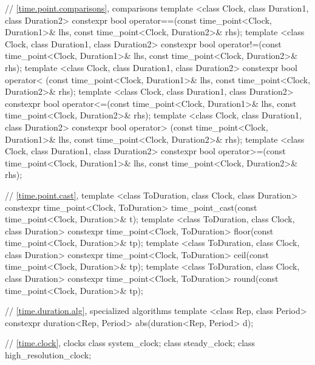 \begin{codeblock}
{{    // \ref{time.point.comparisons},  comparisons
    template <class Clock, class Duration1, class Duration2>
       constexpr bool operator==(const time_point<Clock, Duration1>& lhs,
                                 const time_point<Clock, Duration2>& rhs);
    template <class Clock, class Duration1, class Duration2>
       constexpr bool operator!=(const time_point<Clock, Duration1>& lhs,
                                 const time_point<Clock, Duration2>& rhs);
    template <class Clock, class Duration1, class Duration2>
       constexpr bool operator< (const time_point<Clock, Duration1>& lhs,
                                 const time_point<Clock, Duration2>& rhs);
    template <class Clock, class Duration1, class Duration2>
       constexpr bool operator<=(const time_point<Clock, Duration1>& lhs,
                                 const time_point<Clock, Duration2>& rhs);
    template <class Clock, class Duration1, class Duration2>
       constexpr bool operator> (const time_point<Clock, Duration1>& lhs,
                                 const time_point<Clock, Duration2>& rhs);
    template <class Clock, class Duration1, class Duration2>
       constexpr bool operator>=(const time_point<Clock, Duration1>& lhs,
                                 const time_point<Clock, Duration2>& rhs);

    // \ref{time.point.cast}, 
    template <class ToDuration, class Clock, class Duration>
      constexpr time_point<Clock, ToDuration>
      time_point_cast(const time_point<Clock, Duration>& t);
    template <class ToDuration, class Clock, class Duration>
      constexpr time_point<Clock, ToDuration>
      floor(const time_point<Clock, Duration>& tp);
    template <class ToDuration, class Clock, class Duration>
      constexpr time_point<Clock, ToDuration>
      ceil(const time_point<Clock, Duration>& tp);
    template <class ToDuration, class Clock, class Duration>
      constexpr time_point<Clock, ToDuration>
      round(const time_point<Clock, Duration>& tp);

    // \ref{time.duration.alg}, specialized algorithms
    template <class Rep, class Period>
      constexpr duration<Rep, Period> abs(duration<Rep, Period> d);

    // \ref{time.clock}, clocks
    class system_clock;
    class steady_clock;
    class high_resolution_clock;
  }

}
\end{codeblock}
